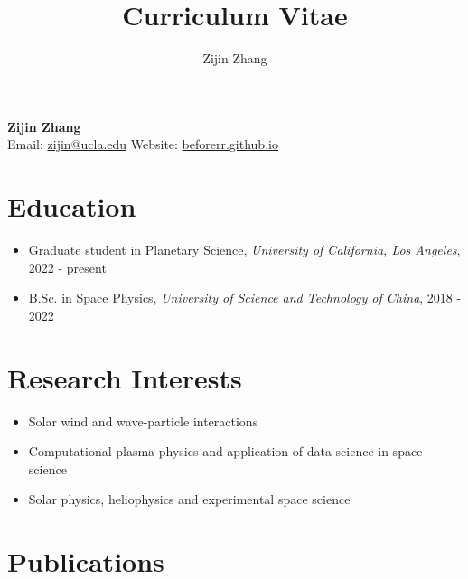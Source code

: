 \documentclass[
  letterpaper,
  DIV=11,
  numbers=noendperiod]{scrartcl}
\title{Curriculum Vitae}
\author{Zijin Zhang}
\date{}
\begin{document}
\maketitle

\begin{center}
    \textbf{\Large Zijin Zhang} \\ \vspace{5pt}
    Email: \href{mailto:zijin@ucla.edu}{zijin@ucla.edu} \quad
    Website: \href{https://beforerr.github.io/beforerr/docs/research/}{beforerr.github.io}
\end{center}

\section{Education}\label{education}

\begin{itemize}
\item
  Graduate student in Planetary Science, \emph{University of California, Los Angeles}, 2022 - present
\item
  B.Sc. in Space Physics, \emph{University of Science and Technology of China}, 2018 - 2022
\end{itemize}

\section{Research Interests}\label{research-interests}

\begin{itemize}
\item
  Solar wind and wave‑particle interactions
\item
  Computational plasma physics and application of data science in space science
\item
  Solar physics, heliophysics and experimental space science
\end{itemize}

\section{Publications}\label{publications}
\end{document}
